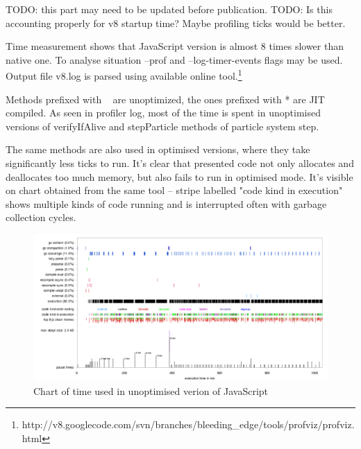 TODO: this part may need to be updated before publication.
TODO: Is this accounting properly for v8 startup time? Maybe profiling ticks would be better.




Time measurement shows that JavaScript version is almost 8 times slower than native one. To analyse situation --prof and --log-timer-events flags may be used. Output file v8.log is parsed using available online tool.\footnote{http://v8.googlecode.com/svn/branches/bleeding\_edge/tools/profviz/profviz.html}



Methods prefixed with ~ are unoptimized, the ones prefixed with * are JIT compiled. As seen in profiler log, most of the time is spent in unoptimised versions of verifyIfAlive and stepParticle methods of particle system step.



The same methods are also used in optimised versions, where they take significantly less ticks to run. It's clear that presented code not only allocates and deallocates too much memory, but also fails to run in optimised mode. It's visible on chart obtained from the same tool -- stripe labelled "code kind in execution" shows multiple kinds of code running and is interrupted often with garbage collection cycles.

\begin{figure}[h!]
  \caption{Chart of time used in unoptimised verion of JavaScript}
  \label{img:particles1profile}
  \centering
	\includegraphics[width=16cm]{particles/particles1-profile.png}
\end{figure}

